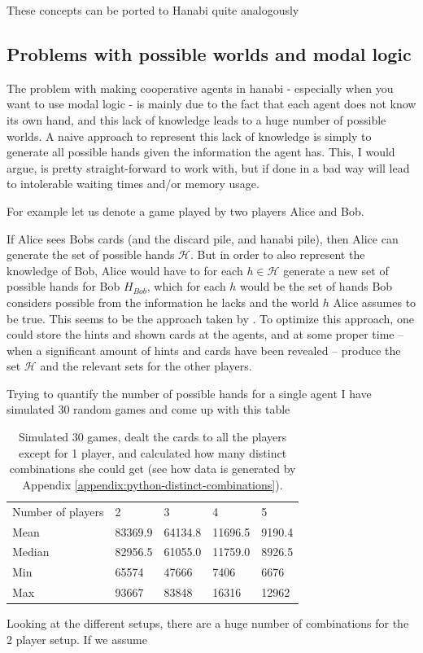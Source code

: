 These concepts can be ported to Hanabi quite analogously






\subsection{Problems with possible worlds and modal logic}
The problem with making cooperative agents in hanabi - especially when you want to use modal logic - is mainly due to the fact that each agent does not know its own hand, and this lack of knowledge leads to a huge number of possible worlds. 
A naive approach to represent this lack of knowledge is simply to generate all possible hands given the information the agent has.
This, I would argue, is pretty straight-forward to work with, but if done in a bad way will lead to intolerable waiting times and/or memory usage.

For example let us denote a game played by two players Alice and Bob. 

If Alice sees Bobs cards (and the discard pile, and hanabi pile), then Alice can generate the set of possible hands $\mathcal{H}$.
But in order to also represent the knowledge of Bob, Alice would have to for each $h \in \mathcal{H}$ generate a new set of possible hands for Bob $H_{Bob}$, which for each $h$ would be the set of hands Bob considers possible from the information he lacks and the world $h$ Alice assumes to be true. 
This seems to be the approach taken by \cite{EgerM17}.
To optimize this approach, one could store the hints and shown cards at the agents, and at some proper time -- when a significant amount of hints and cards have been revealed -- produce the set $\mathcal{H}$ and the relevant sets for the other players.

Trying to quantify the number of possible hands for a single agent I have simulated 30 random games and come up with this table

\begin{table}[]
\begin{tabular}{l|llll}
Number of players & 2       & 3       & 4       & 5      \\
Mean              & 83369.9 & 64134.8 & 11696.5 & 9190.4 \\
Median            & 82956.5 & 61055.0 & 11759.0 & 8926.5 \\
Min               & 65574   & 47666   & 7406    & 6676   \\
Max               & 93667   & 83848   & 16316   & 12962 
\end{tabular}
	\caption{Simulated 30 games, dealt the cards to all the players except for 1 player, and calculated how many distinct combinations she could get (see how data is generated by Appendix \ref{appendix:python-distinct-combinations}).}
\end{table}


Looking at the different setups, there are a huge number of combinations for the 2 player setup. If we assume

